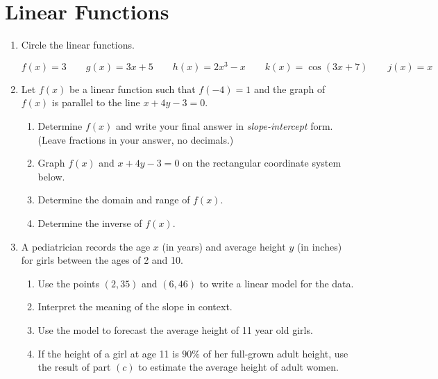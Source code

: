 \documentclass[11pt]{article}
\begin{document}
\section{Linear Functions}
\begin{enumerate}



\item Circle the linear functions.

$$f(x)=3 \quad \quad g(x)=3x+5 \quad \quad h(x)=2x^3-x  \quad \quad k(x)=\cos(3x+7) \quad \quad j(x)=x$$

\item Let $f(x)$ be a linear function such that $\displaystyle f(-4)=1$ and the graph of $f(x)$ is parallel to the line $x+4y-3=0$. 
\begin{enumerate}
\item Determine $f(x)$ and write your final answer in \emph{slope-intercept} form. (Leave fractions in your answer, no decimals.)
\vfill
\newpage
\item Graph $f(x)$ and  $x+4y-3=0$ on the rectangular coordinate system below.\\

\item Determine the domain and range of $f(x)$.\\[.3in]
\item Determine the inverse of $f(x)$.
\vfill
\end{enumerate}

\item A pediatrician records the age $x$ (in years) and average height $y$ (in inches) for girls between the ages of 2 and 10.

\begin{enumerate}
\item Use the points $(2,35)$ and $(6,46)$ to write a linear model for the data.
\vfill
\vfill
\item Interpret the meaning of the slope in context.
\vfill
\item Use the model to forecast the average height of 11 year old girls.
\vfill
\item If the height of a girl at age 11 is $90\%$ of her full-grown adult height, use the result of part $(c)$ to estimate the average height of adult women.  
\vfill


\end{enumerate}
\end{enumerate}
\end{document}
